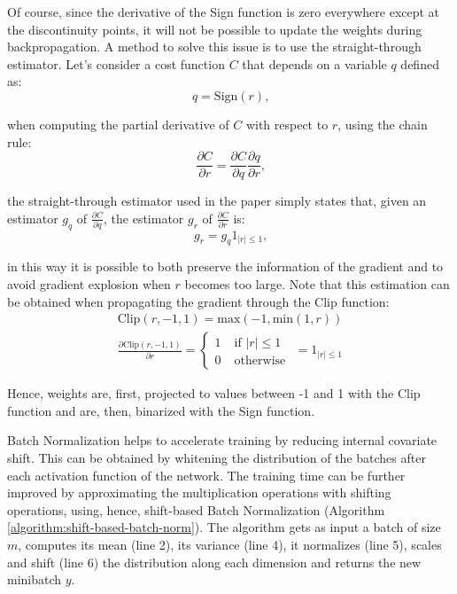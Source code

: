 \documentclass[a4paper]{article}
\numberwithin{equation}{section} %
\numberwithin{figure}{section} %
\numberwithin{table}{section} %
\theoremstyle{definition}
\begin{document}
Of course, since the derivative of the Sign function is zero
everywhere except at the discontinuity points, it will not
be possible to update the weights during backpropagation.
A method to solve this issue is to use the straight-through
estimator. Let's consider a cost function $C$ that depends
on a variable $q$ defined as:
\begin{equation*}
    q = \text{Sign}(r)\text{,}
\end{equation*}

\noindent when computing the partial derivative of $C$ with
respect to $r$, using the chain rule:
\begin{equation*}
    \frac{\partial C}{\partial r}
      = \frac{\partial C}{\partial q}
        \frac{\partial q}{\partial r}\text{,}
\end{equation*}

\noindent the straight-through estimator used in the paper
simply states that, given an estimator $g_q$ of
$\frac{\partial C}{\partial q}$, the estimator $g_r$ of
$\frac{\partial C}{\partial r}$ is:
\begin{equation*}
    g_r = g_q 1_{|r| \le 1}\text{,}
\end{equation*}

\noindent in this way it is possible to both preserve the
information of the gradient and to avoid gradient explosion
when $r$ becomes too large. Note that this estimation can
be obtained when propagating the gradient through the Clip
function:
\begin{gather*}
    \text{Clip}(r, -1, 1) = \text{max}(-1, \text{min}(1, r))
\\
    \frac{\partial \text{Clip}(r, -1, 1)}{\partial r}
    =
        \begin{cases}
    	    1 & \; \text{if } |r| \le 1\\
    		0 & \; \text{otherwise }
    	\end{cases}
    =
    	1_{|r| \le 1}
\end{gather*}

Hence, weights are, first, projected to values between -1
and 1
with the Clip function and are, then, binarized with the Sign
function.

Batch Normalization\cite{batchnormalization} helps to
accelerate training by reducing internal covariate shift.
This can be obtained by whitening the distribution of the
batches after each activation function of the network.
The training time can be further improved by approximating
the multiplication operations with shifting operations, using,
hence, shift-based Batch Normalization (Algorithm
\ref{algorithm:shift-based-batch-norm}). The algorithm
gets as input a batch of size $m$, computes its mean (line 2),
its variance (line 4), it normalizes (line 5), scales 
and shift (line 6) the distribution along each dimension and
returns the new minibatch $y$.
\end{document}
